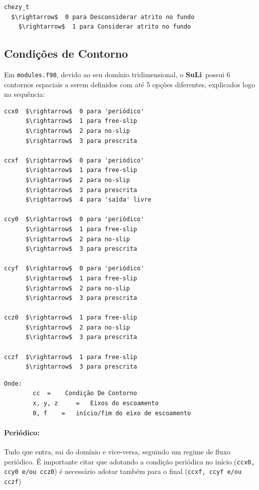 \documentclass[12pt, a4paper]{article}
\newcommand{\SL}{{\bf SuLi}}
\begin{document}
\begin{lstlisting}[escapeinside='']
chezy_t	
  $\rightarrow$  0 para Desconsiderar atrito no fundo
	$\rightarrow$  1 para Considerar atrito no fundo
\end{lstlisting}



\subsection{Condições de Contorno}
Em \verb|modules.f90|, devido ao seu domínio tridimensional, o \SL\ possui 6 contornos espaciais a serem definidos com até 5 opções diferentes, explicados logo na sequência:
\begin{lstlisting}[escapeinside='']
ccx0  $\rightarrow$  0 para 'periódico'
      $\rightarrow$  1 para free-slip
      $\rightarrow$  2 para no-slip
      $\rightarrow$  3 para prescrita

ccxf  $\rightarrow$  0 para 'periódico'
      $\rightarrow$  1 para free-slip
      $\rightarrow$  2 para no-slip
      $\rightarrow$  3 para prescrita
      $\rightarrow$  4 para 'saída' livre
      
ccy0  $\rightarrow$  0 para 'periódico'
      $\rightarrow$  1 para free-slip
      $\rightarrow$  2 para no-slip
      $\rightarrow$  3 para prescrita
      
ccyf  $\rightarrow$  0 para 'periódico'
      $\rightarrow$  1 para free-slip
      $\rightarrow$  2 para no-slip
      $\rightarrow$  3 para prescrita
      
ccz0  $\rightarrow$  1 para free-slip
      $\rightarrow$  2 para no-slip
      $\rightarrow$  3 para prescrita
      
cczf  $\rightarrow$  1 para free-slip
      $\rightarrow$  3 para prescrita
\end{lstlisting}

\begin{verbatim}
Onde: 	
		cc 	=	 Condição De Contorno
		x, y, z 	=	Eixos do escoamento
		0, f	= 	início/fim do eixo de escoamento
\end{verbatim}

\paragraph{Periódico:} Tudo que entra, sai do domínio e vice-versa, seguindo um regime de fluxo periódico. É importante citar que adotando a condição periódica no início (\verb|ccx0, ccy0 e/ou ccz0|) é necessário adotar também para o final (\verb|ccxf, ccyf e/ou cczf|)
\end{document}
